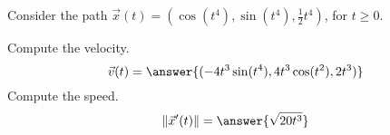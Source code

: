 \begin{problem}
Consider the path $\vec{x}(t) = (\cos(t^4), \sin(t^4), \frac{1}{2}t^4)$, for $t \geq 0$.

Compute the velocity.
\[
\vec{v}(t) = \answer{(-4t^3\sin(t^4), 4t^3\cos(t^2), 2t^3)}
\]
Compute the speed.
\[
\|\vec{x}'(t)\| = \answer{\sqrt{20t^3}}
\]
\end{problem}